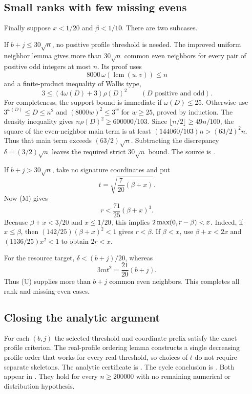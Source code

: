 \subsection{Small ranks with few missing evens}
Finally suppose $x<1/20$ and $\beta<1/10$. There are two subcases.

If $b+j\le30\sqrt n$, no positive profile threshold is needed. The improved uniform neighbor lemma gives more than $30\sqrt n$ common even neighbors for every pair of positive odd integers at most $n$. Its proof uses
\[
 8000\,\omega(\operatorname{lcm}(u,v))\le n
\]
and a finite-product inequality of Wallis type,
\[
 3\le(4\omega(D)+3)\rho(D)^2\qquad(D\text{ positive and odd}).
\]
For completeness, the support bound is immediate if $\omega(D)\le25$. Otherwise use $3^{\omega(D)}\le D\le n^2$ and $(8000w)^2\le3^w$ for $w\ge25$, proved by induction. The density inequality gives $n\rho(D)^2\ge600000/103$. Since $\lfloor n/2\rfloor\ge49n/100$, the square of the even-neighbor main term is at least $(144060/103)n>(63/2)^2n$. Thus that main term exceeds $(63/2)\sqrt n$. Subtracting the discrepancy $\delta=(3/2)\sqrt n$ leaves the required strict $30\sqrt n$ bound. The source is .

If $b+j>30\sqrt n$, take no signature coordinates and put
\[
 t=\sqrt{\frac7{20}(\beta+x)}.
\]
Now (M) gives
\[
 r<\frac{71}{25}(\beta+x)^3.
\]
Because $\beta+x<3/20$ and $x\le1/20$, this implies $2\max(0,r-\beta)<x$. Indeed, if $x\le\beta$, then $(142/25)(\beta+x)^2<1$ gives $r<\beta$. If $\beta<x$, use $\beta+x<2x$ and $(1136/25)x^2<1$ to obtain $2r<x$.

For the resource target, $\delta<(b+j)/20$, whereas
\[
 3mt^2=\frac{21}{20}(b+j).
\]
Thus (U) supplies more than $b+j$ common even neighbors. This completes all rank and missing-even cases.

\subsection{Closing the analytic argument}
For each $(b,j)$ the selected threshold and coordinate prefix satisfy the exact profile criterion. The real-profile ordering lemma constructs a single decreasing profile order that works for every real threshold, so choices of $t$ do not require separate skeletons. The analytic certificate is . The cycle conclusion is . Both appear in . They hold for every $n\ge200000$ with no remaining numerical or distribution hypothesis.
